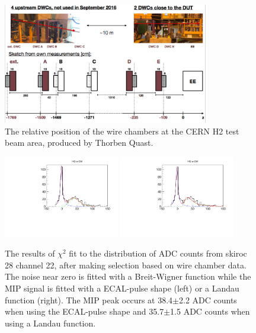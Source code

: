\begin{figure}[htbp]
   \centering
   \includegraphics[width=0.8\textwidth]{DWC.png}
   \caption{The relative position of the wire chambers at the CERN H2 test beam area, produced by Thorben Quast.}
   \label{fig:DWC}
\end{figure}

\begin{figure}[htbp]
   \centering
   \includegraphics[width=0.45\textwidth]{trial_fitpulse_skiroc28_chan22.pdf}
   \includegraphics[width=0.45\textwidth]{trial_fitlandau_skiroc28_chan22.pdf}
   \caption{The results of $\chi^2$ fit to the distribution of ADC counts from skiroc 28 channel 22, 
 after making selection based on wire chamber data. The noise near zero is fitted with a Breit-Wigner function 
 while the MIP signal is fitted with a ECAL-pulse shape (left) or a Landau function (right). The MIP peak 
 occurs at 38.4$\pm$2.2 ADC counts when using the ECAL-pulse shape and 35.7$\pm$1.5 ADC counts when using a 
 Landau function.}
   \label{fig:normalfit}
\end{figure}

